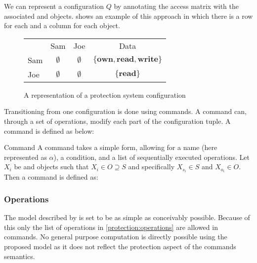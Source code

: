 We can represent a configuration $Q$ by annotating the access matrix with the associated \subjects{} and objects.
 shows an example of this approach in which there is a row for each \ssubject{} and a column for each object.

\begin{figure}[h]
\centering
\begin{tabular}{l|c|c|c|}
\multicolumn{1}{c}{} & \multicolumn{1}{c}{Sam} & \multicolumn{1}{c}{Joe} & \multicolumn{1}{c}{Data} \\\cline{2-4}
Sam & $\emptyset$ & $\emptyset$ & $\{\textbf{own}, \textbf{read}, \textbf{write}\}$ \\\cline{2-4}
Joe & $\emptyset$ & $\emptyset$ & $\{\textbf{read}\}$ \\\cline{2-4}
\end{tabular}
\caption{A representation of a protection system configuration}
\label{protection:matrixsmall}
\end{figure}

Transitioning from one configuration is done using commands.
A command can, through a set of operations, modify each part of the configuration tuple.
A command is defined as below:

\begin{definition}{Command}
A command takes a simple form, allowing for a name (here represented as $\alpha$), a condition, and a list of sequentially executed operations.
Let $X_i$ be \subjects{} and objects such that $X_i \in O \supseteq S$ and specifically $X_{s_i} \in S$ and $X_{o_i} \in O$.
Then a command is defined as:
\begin{algorithm}[H]
  \DontPrintSemicolon
  \cmd {} 
\end{algorithm}
\end{definition}

\subsubsection{Operations}
The model described by \citet{HRU} is set to be as simple as conceivably possible.
Because of this only the list of operations in \cref{protection:operations} are allowed in commands.
No general purpose computation is directly possible using the proposed model as it does not reflect the protection aspect of the commands semantics.

